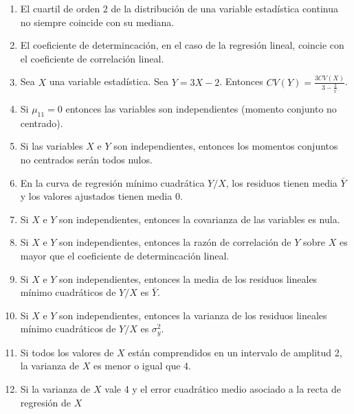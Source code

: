 \documentclass[fleqn]{article}
\begin{document}
\begin{enumerate}
                        \begin{enumerate}
                                \item El cuartil de orden 2 de la distribución de una variable estadística continua no siempre 
                                        coincide con su mediana.
                                \item El coeficiente de determincación, en el caso de la regresión lineal, coincie con el 
                                        coeficiente de correlación lineal.
                                \item Sea $X$ una variable estadística. Sea $Y = 3X - 2$. Entonces 
                                        $CV(Y) = \frac{3CV(X)}{3 - \frac{2}{\bar{x}}}$.
                                \item Si $\mu_{11} = 0$ entonces las variables son independientes (momento conjunto no centrado).
                                \item Si las variables $X$ e $Y$ son independientes, entonces los momentos conjuntos no centrados
                                        serán todos nulos.
                                \item En la curva de regresión mínimo cuadrática $Y/X$, los residuos tienen media $\bar{Y}$ y los 
                                        valores ajustados tienen media 0.
                                \item Si $X$ e $Y$ son independientes, entonces la covarianza de las variables es nula.
                                \item Si $X$ e $Y$ son independientes, entonces la razón de correlación de $Y$ sobre $X$ es mayor que
                                        el coeficiente de determincación lineal.
                                \item Si $X$ e $Y$ son independientes, entonces la media de los residuos lineales mínimo cuadráticos 
                                        de $Y/X$ es $\bar{Y}$.
                                \item Si $X$ e $Y$ son independientes, entonces la varianza de los residuos lineales mínimo cuadráticos
                                        de $Y/X$ es $\sigma_y ^2$.
                                \item Si todos los valores de $X$ están comprendidos en un intervalo de amplitud 2, la varianza de $X$ es 
                                        menor o igual que 4.
                                \item Si la varianza de $X$ vale 4 y el error cuadrático medio asociado a la recta de regresión de $X$

\end{enumerate}
\end{enumerate}
\end{document}
